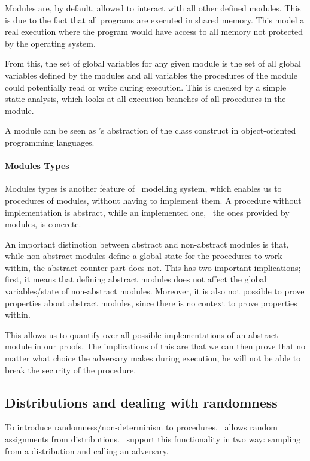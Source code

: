 Modules are, by default, allowed to interact with all other defined modules.
This is due to the fact that all programs are executed in shared memory. This
model a real execution where the program would have access to
all memory not protected by the operating system.

From this, the set of global variables for any given module is the set of all
global variables defined by the modules and all variables the procedures of the module
could potentially read or write during execution. This is checked by a simple
static analysis, which looks at all execution branches of all procedures in the module.

A module can be seen as \easycrypt's abstraction of the class construct
in object-oriented programming languages.

\paragraph{Modules Types}
\label{sec:ec_module_types}
Modules types is another feature of \easycrypt\ modelling system, which
enables us to procedures of modules, without having to implement
them. A procedure without implementation is abstract, while
an implemented one, \ie\ the ones provided by modules, is concrete.

An important distinction between abstract and non-abstract modules is that,
while non-abstract modules define a global state for the procedures to work
within, the abstract counter-part does not. This has two important implications;
first, it means that defining abstract modules does not affect the global
variables/state of non-abstract modules.
Moreover, it is also not possible to prove properties about abstract modules, since
there is no context to prove properties within.

This allows us to quantify over all possible implementations of an abstract
module in our proofs.
The implications of this are that we can then prove that no matter what choice
the adversary makes during execution, he will not be able to break the security
of the procedure.

\subsection{Distributions and dealing with randomness}
\label{sec:easycrypt:distributions}
To introduce randomness/non-determinism to procedures, \easycrypt\ allows
random assignments from distributions. \easycrypt\ support this functionality in
two way: sampling from a distribution and calling an adversary.

